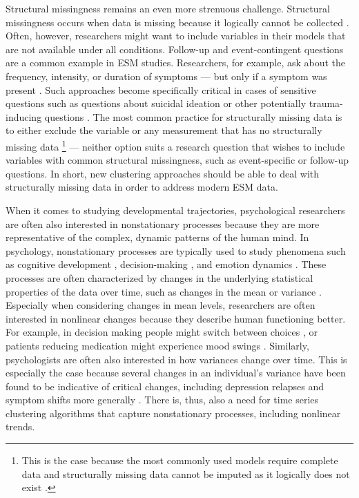 \documentclass[man, 12pt, a4paper, mask, floatsintext]{apa7}
\theoremstyle{break}
\theoremstyle{plain}
\begin{document}
Structural missingness remains an even more strenuous challenge. Structural missingness occurs when data is missing because it logically cannot be collected \citep[as opposed to probabilistically missing data;][]{little2020, mclean2017}. Often, however, researchers might want to include variables in their models that are not available under all conditions. Follow-up and event-contingent questions are a common example in ESM studies. Researchers, for example, ask about the frequency, intensity, or duration of symptoms --- but only if a symptom was present \citep{kivela2022}. Such approaches become specifically critical in cases of sensitive questions such as questions about suicidal ideation or other potentially trauma-inducing questions \citep[e.g.,][]{glenn2022}. The most common practice for structurally missing data is to either exclude the variable or any measurement that has no structurally missing data \citep[e.g.,][]{lavori2008}\footnote{This is the case because the most commonly used models require complete data \citep{schafer2002} and structurally missing data cannot be imputed as it logically does not exist \citep[e.g.,][]{lavori2008}.} --- neither option suits a research question that wishes to include variables with common structural missingness, such as event-specific or follow-up questions. In short, new clustering approaches should be able to deal with structurally missing data in order to address modern ESM data.

When it comes to studying developmental trajectories, psychological researchers are often also interested in nonstationary processes because they are more representative of the complex, dynamic patterns of the human mind. In psychology, nonstationary processes are typically used to study phenomena such as cognitive development \citep[][]{quartz1997}, decision-making \citep[][]{ratcliff2016}, and emotion dynamics \citep[][]{bringmann2018b}. These processes are often characterized by changes in the underlying statistical properties of the data over time, such as changes in the mean or variance \citep[][]{molenaar2009}. Especially when considering changes in mean levels, researchers are often interested in nonlinear changes because they describe human functioning better. For example, in decision making people might switch between choices \citep[][]{ratcliff2016}, or patients reducing medication might experience mood swings \citep[][]{helmich2020a}. Similarly, psychologists are often also interested in how variances change over time. This is especially the case because several changes in an individual's variance have been found to be indicative of critical changes, including depression relapses and symptom shifts more generally \citep[e.g.,][]{schreuder2020, wichers2020}. There is, thus, also a need for time series clustering algorithms that capture nonstationary processes, including nonlinear trends.
\end{document}
